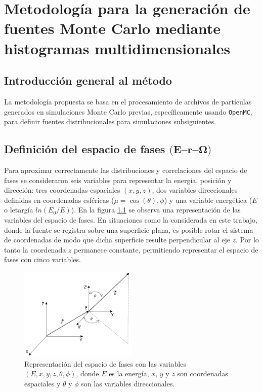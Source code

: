 \chapter{Metodología para la generación de fuentes Monte Carlo mediante histogramas multidimensionales}
\label{cap:metodo_histogramas}
\section{Introducción general al método}
La metodología propuesta se basa en el procesamiento de archivos de partículas generados en simulaciones Monte Carlo previas, específicamente usando \texttt{OpenMC}, para definir fuentes distribucionales para simulaciones subsiguientes.

\section{Definición del espacio de fases \texorpdfstring{$(\mathbf{E}$--$\mathbf{r}$--$\boldsymbol{\Omega})$}{(E--r--Omega)}}
Para aproximar correctamente las distribuciones y correlaciones del espacio de fases se consideraron seis variables para representar la energía, posición y dirección: tres coordenadas espaciales $(x, y, z)$, dos variables direccionales definidas en coordenadas esféricas ($\mu = \cos(\theta), \phi$) y una variable energética ($E$ o letargía $ln(E_0/E)$). En la figura \ref{fig:terna} se observa una representación de las variables del espacio de fases. En situaciones como la considerada en este trabajo, donde la fuente se registra sobre una superficie plana, es posible rotar el sistema de coordenadas de modo que dicha superficie resulte perpendicular al eje $z$. Por lo tanto la coordenada $z$ permanece constante, permitiendo representar el espacio de fases con cinco variables.

\begin{figure}[h]
    \centering
    \includegraphics[width=0.5\textwidth]{figs/terna.png}
    \caption{Representación del espacio de fases con las variables $(E, x, y, z, \theta, \phi)$, donde $E$ es la energía, $x$, $y$ y $z$ son coordenadas espaciales y $\theta$ y $\phi$ son las variables direccionales.}
    \label{fig:terna}
\end{figure}

